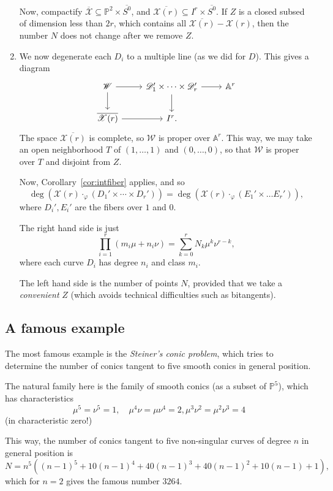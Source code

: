 \documentclass[leqno, openany]{memoir}
\theoremstyle{definition}
\theoremstyle{remark}
\theoremstyle{plain}
\theoremstyle{definition}
\theoremstyle{remark}
\newcommand{\A}{\mathbb{A}}
\renewcommand{\P}{\mathbb{P}}
\newcommand{\msc}[1]{\mathscr{#1}}
\begin{document}
\begin{enumerate}
Now, compactify $\overline{\msc{X}} \subseteq \P^2 \times \overline{S^0}$, and $\overline{\msc{X}(r)}\subseteq I^r \times \overline{S^0}$. If $Z$ is a closed subsed of dimension less than $2r$, which contains all $\overline{\msc{X}(r)}-\msc{X}(r)$, then the number $N$ does not change after we remove $Z$.
    \item We now degenerate each $D_i$ to a multiple line (as we did for $D$). This gives a diagram
\[ \begin{tikzcd} \msc{W} \arrow[r] \arrow[d] & \msc{D}_1' \times \cdots \times \msc{D}_r' \arrow[r] \arrow[d] & \A^r \\ \overline{\msc{X}(r)} \arrow[r]& I^r. \end{tikzcd} \]
The space $\overline{\msc{X}(r)}$ is complete, so $\msc{W}$ is proper over $\A^r$. This way, we may take an open neighborhood $T$ of $(1, \dots, 1)$ and $(0, \dots, 0)$, so that $\msc{W}$ is proper over $T$ and disjoint from $Z$. 

Now, Corollary~\ref{cor:intfiber} applies, and so
\[ \deg(\msc{X}(r) \cdot_\varphi (D_1' \times \cdots \times D_r')) = \deg(\msc{X}(r) \cdot_\varphi (E_1' \times \dots E_r')), \]
where $D_i', E_i'$ are the fibers over $1$ and $0$.

The right hand side is just
\[ \prod_{i=1}^r (m_i \mu + n_i \nu) = \sum_{k=0}^r N_k \mu^k \nu^{r-k}, \]
where each curve $D_i$ has degree $n_i$ and class $m_i$. 

The left hand side is the number of points $N$, provided that we take a \emph{convenient} $Z$ (which avoids technical difficulties such as bitangents). 
\end{enumerate}

\subsection{A famous example}%
\label{sub:a_famous_example}

The most famous example is the \emph{Steiner's conic problem}, which tries to determine the number of conics tangent to five smooth conics in general position. 

The natural family here is the family of smooth conics (as a subset of $\P^5$), which has characteristics
\[ \mu^5=\nu^5=1, \quad \mu^4\nu=\mu\nu^4=2, \mu^3\nu^2=\mu^2\nu^3=4 \]
(in characteristic zero!)

This way, the number of conics tangent to five non-singular curves of degree $n$ in general position is
\[ N=n^5({ (n-1) }^5+10{ (n-1) }^4+40{ (n-1) }^3+40{ (n-1) }^2+10(n-1)+1), \]
which for $n=2$ gives the famous number $3264$. 
\end{document}
